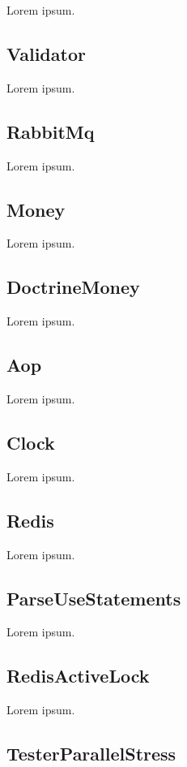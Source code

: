 Lorem ipsum.

\subsection{Validator}

Lorem ipsum.

\subsection{RabbitMq}

Lorem ipsum.

\subsection{Money}

Lorem ipsum.

\subsection{DoctrineMoney}

Lorem ipsum.

\subsection{Aop}

Lorem ipsum.

\subsection{Clock}

Lorem ipsum.

\subsection{Redis}

Lorem ipsum.

\subsection{ParseUseStatements}

Lorem ipsum.

\subsection{RedisActiveLock}

Lorem ipsum.

\subsection{TesterParallelStress}

